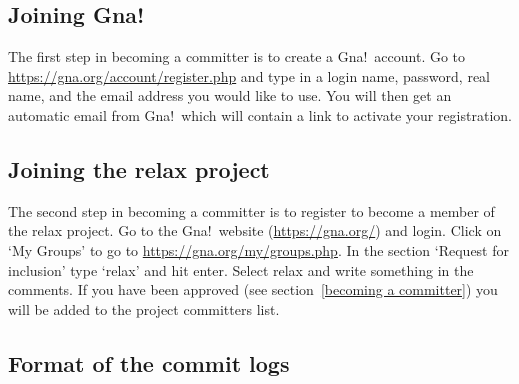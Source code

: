 \subsection{Joining Gna!}

The first step in becoming a committer is to create a Gna!\ account.
Go to \href{https://gna.org/account/register.php}{https://gna.org/account/register.php} and type in a login name, password, real name, and the email address you would like to use.
You will then get an automatic email from Gna!\ which will contain a link to activate your registration.



\subsection{Joining the relax project}

The second step in becoming a committer is to register to become a member of the relax project.
Go to the Gna!\ website (\href{https://gna.org/}{https://gna.org/}) and login.
Click on `My Groups' to go to \href{https://gna.org/my/groups.php}{https://gna.org/my/groups.php}.
In the section `Request for inclusion' type `relax' and hit enter.
Select relax and write something in the comments.
If you have been approved (see section~\ref{becoming a committer}) you will be added to the project committers list.



\subsection{Format of the commit logs}\label{commit log format}

